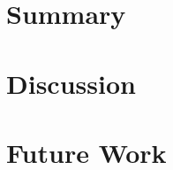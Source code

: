 \documentclass[main.tex]{subfiles}
\begin{document}
\section{Summary}


\section{Discussion}


\section{Future Work}
\end{document}
